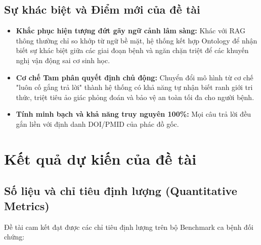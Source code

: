 \documentclass[12pt,a4paper]{article}
\begin{document}
\subsection{Sự khác biệt và Điểm mới của đề tài}
\begin{itemize}[leftmargin=1.27cm]
    \item \textbf{Khắc phục hiện tượng đứt gãy ngữ cảnh lâm sàng:} Khác với RAG thông thường chỉ so khớp từ ngữ bề mặt, hệ thống kết hợp Ontology để nhận biết sự khác biệt giữa các giai đoạn bệnh và ngăn chặn triệt để các khuyến nghị vận động sai cơ sinh học.
    \item \textbf{Cơ chế Tam phân quyết định chủ động:} Chuyển đổi mô hình từ cơ chế "luôn cố gắng trả lời" thành hệ thống có khả năng tự nhận biết ranh giới tri thức, triệt tiêu ảo giác phỏng đoán và bảo vệ an toàn tối đa cho người bệnh.
    \item \textbf{Tính minh bạch và khả năng truy nguyên 100\%:} Mọi câu trả lời đều gắn liền với định danh DOI/PMID của phác đồ gốc.
\end{itemize}

\section{Kết quả dự kiến của đề tài}

\subsection{Số liệu và chỉ tiêu định lượng (Quantitative Metrics)}
Đề tài cam kết đạt được các chỉ tiêu định lượng trên bộ Benchmark ca bệnh đối chứng:
\end{document}
